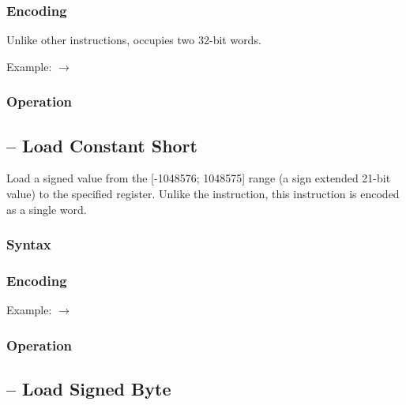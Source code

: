 \documentclass[a4paper,12pt,twoside,extrafontsizes]{memoir}
\begin{document}
{

\subsubsection{Encoding}


Unlike other instructions,  occupies two 32-bit words.

Example:  $\rightarrow$ 

\subsubsection{Operation}


\subsection{ -- Load Constant Short}
\label{subsec:instr:lcs}

Load a signed value from the [-1048576; 1048575] range (a sign extended 21-bit value) to the specified register. Unlike the  instruction, this instruction is encoded as a single word.

\subsubsection{Syntax}


\subsubsection{Encoding}


Example:  $\rightarrow$ 

\subsubsection{Operation}


\subsection{ -- Load Signed Byte}
\label{subsec:instr:lsb}

}
\end{document}
